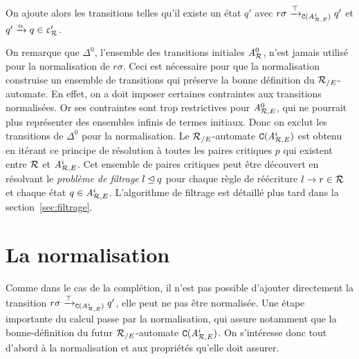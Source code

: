 On ajoute alors les transitions telles qu'il existe un état $q'$ avec
$r\sigma \xrightarrow{\top}_{\mathtt{C}({\mathit A}_{\mathcal R,E}^i)} q'$ et $q'\xrightarrow{\alpha} q \in \upvarepsilon_{\mathcal R}'$. 

On remarque que $\Delta^0$, l'ensemble des transitions initiales ${\mathit A}_{\mathcal R}^0$, n'est jamais utilisé
pour la normalisation de $r\sigma$. Ceci est nécessaire pour que la normalisation construise un ensemble de transitions
qui préserve la bonne définition du ${\mathcal R_{/E}}$-automate.
En effet, on a doit imposer certaines contraintes aux transitions normalisées. Or ses contraintes
sont trop restrictives pour ${\mathit A}_{\mathcal R,E}^0$, qui ne pourrait plus représenter des ensembles infinis de termes initiaux.
Donc on exclut les transitions de $\Delta^0$ pour la normalisation.
Le ${\mathcal R_{/E}}$-automate $\mathtt{C}({\mathit A}_{\mathcal R,E}^i)$ est obtenu en itérant ce
principe de résolution à toutes les paires critiques $p$ qui existent
entre $\mathcal R$ et ${\mathit A}_{\mathcal R,E}^i$. Cet ensemble de paires critiques peut être découvert
 en résolvant le {\em problème de filtrage} $l \unlhd q$ pour chaque règle de
 réécriture $l \rightarrow r\in \mathcal R$ et chaque état $q\in{\mathit A}_{\mathcal R,E}^i$.
L'algorithme de filtrage est détaillé plus tard dans la section~\ref{sec:filtrage}.

\section{La normalisation}
Comme dans le cas de la complétion, il n'est pas possible d'ajouter directement
la transition $r\sigma \xrightarrow{\top}_{\mathtt{C}({\mathit A}_{\mathcal R,E}^{i})} q'$, elle peut ne pas être normalisée.
Une étape importante du calcul passe par la normalisation, qui assure notamment que la bonne-définition
du futur ${\mathcal R_{/E}}$-automate $\mathtt{C}({\mathit A}_{\mathcal R,E}^{i})$. 
On s'intéresse donc tout d'abord à la normalisation et aux propriétés qu'elle doit assurer.



